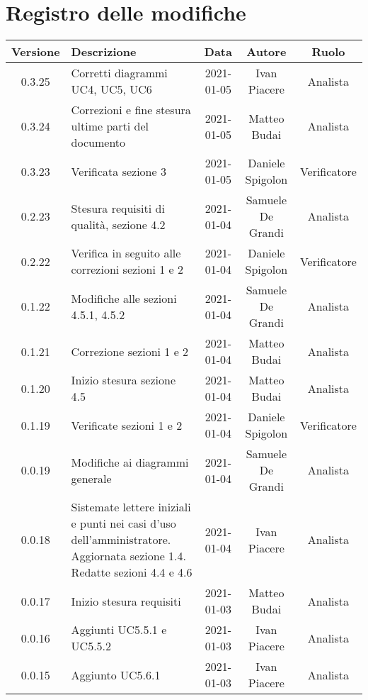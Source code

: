 \section*{Registro delle modifiche}

\begin{center}
	\begin{longtable}{|c|p{5cm}|c|c|c|}
		\hline
		\rowcolor{lighter-grayer}
		\textbf{Versione} & \textbf{Descrizione} & \textbf{Data} & \textbf{Autore} & \textbf{Ruolo} \\
		\hline
		\endfirsthead
		
		0.3.25 & Corretti diagrammi UC4, UC5, UC6 & 2021-01-05 & Ivan Piacere & Analista \\
		\hline
		0.3.24 & Correzioni e fine stesura ultime parti del documento & 2021-01-05 & Matteo Budai & Analista \\
		\hline
		0.3.23 & Verificata sezione 3 & 2021-01-05 & Daniele Spigolon & Verificatore \\
		\hline
		0.2.23 & Stesura requisiti di qualità, sezione 4.2  & 2021-01-04 & Samuele De Grandi & Analista \\
		\hline
		0.2.22 & Verifica in seguito alle correzioni sezioni 1 e 2   & 2021-01-04 & Daniele Spigolon & Verificatore \\
		\hline
		0.1.22 & Modifiche alle sezioni 4.5.1, 4.5.2   & 2021-01-04 & Samuele De Grandi & Analista \\
		\hline
		0.1.21 & Correzione sezioni 1 e 2 & 2021-01-04 & Matteo Budai & Analista \\
		\hline
		0.1.20 & Inizio stesura sezione 4.5 & 2021-01-04 & Matteo Budai & Analista \\
		\hline
		0.1.19 & Verificate sezioni 1 e 2 & 2021-01-04 & Daniele Spigolon & Verificatore \\
		\hline
		0.0.19 & Modifiche ai diagrammi generale  & 2021-01-04 & Samuele De Grandi & Analista \\
		\hline
		0.0.18 & Sistemate lettere iniziali e punti nei casi d'uso dell'amministratore. Aggiornata sezione 1.4. Redatte sezioni 4.4 e 4.6 & 2021-01-04 & Ivan Piacere & Analista \\
		\hline
		0.0.17 & Inizio stesura requisiti & 2021-01-03 & Matteo Budai & Analista \\
		\hline
		0.0.16 & Aggiunti UC5.5.1 e UC5.5.2 & 2021-01-03 & Ivan Piacere & Analista \\
		\hline
		0.0.15 & Aggiunto UC5.6.1 & 2021-01-03 & Ivan Piacere & Analista \\

\end{longtable}
\end{center}
